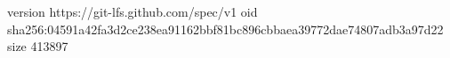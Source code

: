 version https://git-lfs.github.com/spec/v1
oid sha256:04591a42fa3d2ce238ea91162bbf81bc896cbbaea39772dae74807adb3a97d22
size 413897
